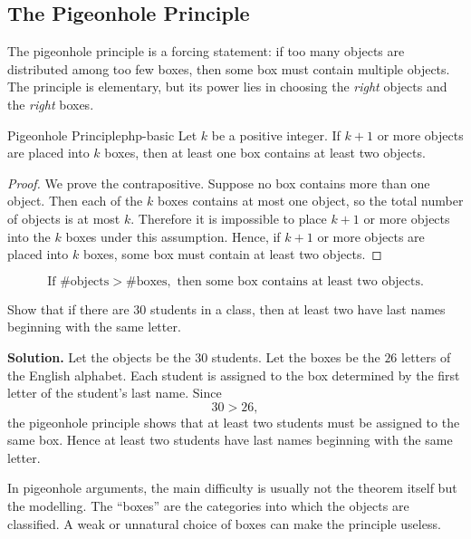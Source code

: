 \subsection{The Pigeonhole Principle}

The pigeonhole principle is a forcing statement: if too many objects are distributed among too few boxes, then some box must contain multiple objects. The principle is elementary, but its power lies in choosing the \emph{right} objects and the \emph{right} boxes.

\begin{theorem}{Pigeonhole Principle}{php-basic}
Let $k$ be a positive integer. If $k+1$ or more objects are placed into $k$ boxes, then at least one box contains at least two objects.
\end{theorem}

\begin{proof}
We prove the contrapositive. Suppose no box contains more than one object. Then each of the $k$ boxes contains at most one object, so the total number of objects is at most $k$. Therefore it is impossible to place $k+1$ or more objects into the $k$ boxes under this assumption. Hence, if $k+1$ or more objects are placed into $k$ boxes, some box must contain at least two objects.
\end{proof}

\begin{keyformula}[title={Most basic forcing pattern}]
\[
\text{If } \#\text{objects}>\#\text{boxes}, \text{ then some box contains at least two objects.}
\]
\end{keyformula}

\begin{examplebox}[title={Tutorial 2, Question 1}]
Show that if there are $30$ students in a class, then at least two have last names beginning with the same letter.

\textbf{Solution.}
Let the objects be the $30$ students. Let the boxes be the $26$ letters of the English alphabet. Each student is assigned to the box determined by the first letter of the student's last name. Since
\[
30>26,
\]
the pigeonhole principle shows that at least two students must be assigned to the same box. Hence at least two students have last names beginning with the same letter.
\end{examplebox}

\begin{commonmistake}[title={Choosing the wrong boxes}]
In pigeonhole arguments, the main difficulty is usually not the theorem itself but the modelling. The ``boxes'' are the categories into which the objects are classified. A weak or unnatural choice of boxes can make the principle useless.
\end{commonmistake}

